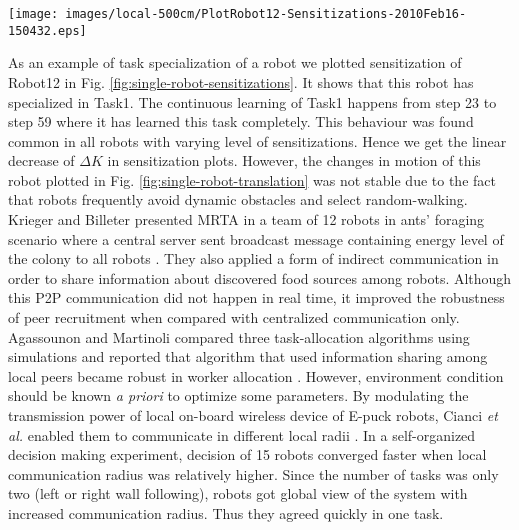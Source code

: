 \begin{figure*}
\begin{minipage}[t]{0.5\linewidth}
\centering
\texttt{[image: images/local-500cm/PlotRobot12-Sensitizations-2010Feb16-150432.eps]}
\caption{\small Task specialization of Robot12 in local mode $r_{comm}$=0.5m}
\label{fig:single-robot-sensitizations} %
\end{minipage} 
\begin{minipage}[t]{0.5\linewidth}
\centering
\caption{\small Changes in translation of Robot12 in local mode $r_{comm}$=0.5m}
\label{fig:single-robot-translation} %
\end{minipage}
\end{figure*}
As an example of task specialization of a robot we plotted sensitization of Robot12 in Fig. \ref{fig:single-robot-sensitizations}. It shows that this robot has specialized in Task1. The continuous learning of Task1 happens from step 23 to step 59 where it has learned this task completely. This behaviour was found common in all robots with varying level of sensitizations. Hence we get the linear decrease of $\Delta K$ in sensitization plots. However, the changes in motion of this robot plotted in Fig. \ref{fig:single-robot-translation} was not stable due to the fact that robots frequently avoid dynamic obstacles and select random-walking.
%
\label{sec:bg}
Krieger and Billeter presented MRTA in a team of 12 robots in ants' foraging scenario where a central server sent broadcast message containing energy level of the colony to all robots \cite{Krieger}. They also applied a form of indirect communication in order to share information about discovered food sources among robots. Although this P2P communication did not happen in real time, it improved the robustness of peer recruitment when compared with centralized communication only. Agassounon and Martinoli compared three task-allocation algorithms using simulations and reported that algorithm that used information sharing among local peers became robust in worker allocation \cite{Agassounon}. However, environment condition should be known {\em a priori} to optimize some parameters. By modulating the transmission power of local on-board wireless device of E-puck robots, Cianci {\em et al.} enabled them to communicate in different local radii \cite{Cianci}. In a self-organized decision making experiment, decision of 15 robots converged faster when local communication radius was relatively higher. Since the number of tasks was only two (left or right wall following), robots got global view of the system with increased communication radius. Thus they agreed quickly in one task.
